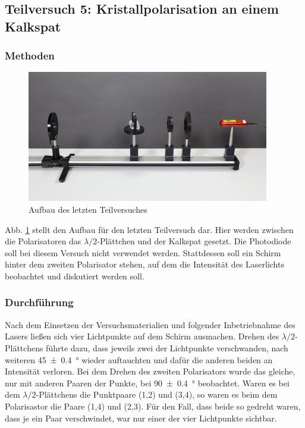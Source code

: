 \subsection{Teilversuch 5: Kristallpolarisation an einem Kalkspat}

	\subsubsection*{Methoden}
		
		\begin{figure}[ht]
			\centering
			\includegraphics[width=\textwidth]{bilder/Kalkspat.png}
			\caption{Aufbau des letzten Teilversuches\cite{WWU}}
			\label{fig:Kalkspat}	
		\end{figure}
		Abb. \ref{fig:Kalkspat} stellt den Aufbau für den letzten Teilversuch dar.
		Hier werden zwischen die Polarisatoren das $\lambda/2$-Plättchen und der Kalkspat gesetzt.
		Die Photodiode soll bei diesem Versuch nicht verwendet werden.
		Stattdessen soll ein Schirm hinter dem zweiten Polarisator stehen, auf dem die Intensität des Laserlichts beobachtet und diskutiert werden soll.
		
	\subsubsection*{Durchführung}
	
		Nach dem Einsetzen der Versuchsmaterialien und folgender Inbetriebnahme des Lasers ließen sich vier Lichtpunkte auf dem Schirm ausmachen.
		Drehen des $\lambda/2$-Plättchens führte dazu, dass jeweils zwei der Lichtpunkte verschwanden, nach weiteren \SI{45+-0,4}{\degree} wieder auftauchten und dafür die anderen beiden an Intensität verloren.
		Bei dem Drehen des zweiten Polarisators wurde das gleiche, nur mit anderen Paaren der Punkte, bei \SI{90+-0,4}{\degree} beobachtet.
		Waren es bei dem $\lambda/2$-Plättchens die Punktpaare (1,2) und (3,4), so waren es beim dem Polarisastor die Paare (1,4) und (2,3).
		Für den Fall, dass beide so gedreht waren, dass je ein Paar verschwindet, war nur einer der vier Lichtpunkte sichtbar.
		
